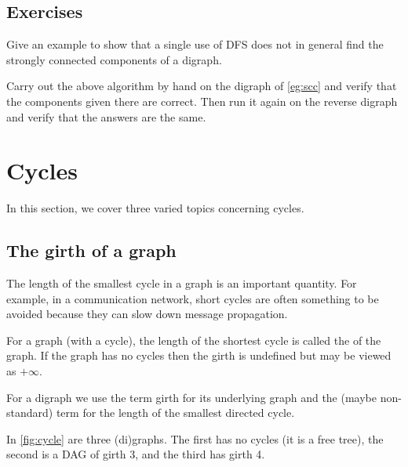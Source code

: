 \subsection*{Exercises}

\begin{Exercise}
\label{ex:DFSfails}
Give an example to show that a single use of DFS does not in general
find the strongly connected components of a digraph.
\end{Exercise}

\begin{Exercise}
\label{ex:dolinscc}
Carry out the above  algorithm by hand on the digraph of
\cref{eg:scc} and verify that the components given there are
correct. Then run it again on the reverse digraph and verify that the
answers are the same.
\end{Exercise}


\section{Cycles}
\label{sec:cycles}

In this section, we cover three varied topics concerning cycles.

\subsection{The girth of a graph}
\label{subssec:girth}

The length of the smallest cycle in a graph is an important quantity. 
For example, in a communication network, short cycles are often something to be
avoided because they can slow down message propagation.

\begin{Definition}
For a graph (with a cycle), the length of the shortest cycle is called
the  of the graph. If the graph has no cycles then the
girth is undefined but may be viewed as $+\infty$.
\end{Definition}

\begin{note} 
For a digraph we use the term girth for its underlying
graph and the (maybe non-standard) term  for
the length of the smallest directed cycle.
\end{note}

\begin{Example}
\label{eg:cycles}
In \cref{fig:cycle} are three (di)graphs.  The first has no cycles 
(it is a free tree), the second is a DAG of girth 3, and the third has girth 4.
\end{Example}

